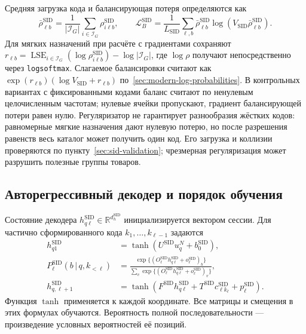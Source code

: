 \documentclass[12pt,a4paper]{article}
\newcommand{\code}[1]{{\ttfamily\small\nolinkurl{#1}}}
\newcommand{\R}{\mathbb R}
\newcommand{\given}{\,\vert\,}
\theoremstyle{plainru}
\begin{document}
Средняя загрузка кода и балансирующая потеря определяются как
\begin{equation}\label{eq:sid-balance}
 \bar\rho_{\ell b}^{\mathrm{SID}}
 =\frac{1}{|\mathcal I_G|}\sum_{i\in\mathcal I_G}
          \rho_{i\ell b}^{\mathrm{SID}},
 \qquad
 \mathcal L_B^{\mathrm{SID}}
 =\frac{1}{L_{\mathrm{SID}}}\sum_{\ell,b}
  \bar\rho_{\ell b}^{\mathrm{SID}}
            \log(V_{\mathrm{SID}}\bar\rho_{\ell b}^{\mathrm{SID}}).
\end{equation}
Для мягких назначений при расчёте с градиентами сохраняют
$r_{\ell b}=\operatorname{LSE}_{i\in\mathcal I_G}
(\log\rho_{i\ell b}^{\mathrm{SID}})-\log|\mathcal I_G|$,
где $\log\rho$ получают непосредственно через \code{logsoftmax}.
Слагаемое балансировки считают как $\exp(r_{\ell b})
(\log V_{\mathrm{SID}}+r_{\ell b})$ по~\ref{sec:modern-log-probabilities}.
В контрольных вариантах с фиксированными кодами баланс считают по
ненулевым целочисленным частотам; нулевые ячейки пропускают,
градиент балансирующей потери равен нулю.
Регуляризатор не гарантирует разнообразия жёстких кодов: равномерные
мягкие назначения дают нулевую потерю, но после разрешения равенств
весь каталог может получить один код. Его загрузка и коллизии
проверяются по пункту~\ref{sec:sid-validation}; чрезмерная регуляризация
может разрушить полезные группы товаров.

\subsection{Авторегрессивный декодер и порядок обучения}
\label{sec:sid-decoder}

Состояние декодера $h_{q\ell}^{\mathrm{SID}}\in\R^{d_h^{\mathrm{SID}}}$
инициализируется вектором сессии. Для частично сформированного кода
$k_1,\ldots,k_{\ell-1}$ задаются
\begin{align}\label{eq:sid-decoder}
 h_{q1}^{\mathrm{SID}}&=\tanh(U^{\mathrm{SID}}u_q^N+b_0^{\mathrm{SID}}),\\
 P_\ell^{\mathrm{SID}}(b\given q,k_{<\ell})
 &=\frac{\exp\{(O_\ell^{\mathrm{SID}}h_{q\ell}^{\mathrm{SID}}
                         +o_\ell^{\mathrm{SID}})_b\}}
 {\sum_v\exp\{(O_\ell^{\mathrm{SID}}h_{q\ell}^{\mathrm{SID}}
                         +o_\ell^{\mathrm{SID}})_v\}},\\
 h_{q,\ell+1}^{\mathrm{SID}}
 &=\tanh(F^{\mathrm{SID}}h_{q\ell}^{\mathrm{SID}}
       +T^{\mathrm{SID}}c_{\ell k_\ell}^{\mathrm{SID}}
       +p_\ell^{\mathrm{SID}}).
\end{align}
Функция $\tanh$ применяется к каждой координате.
Все матрицы и смещения в этих формулах обучаются.
Вероятность полной последовательности --- произведение
условных вероятностей её позиций.
\end{document}
